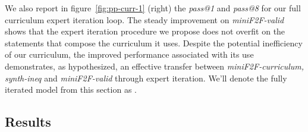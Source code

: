 \documentclass[nohyperref]{article}
\theoremstyle{plain}
\theoremstyle{definition}
\theoremstyle{remark}
\begin{document}
We also report in figure~\ref{fig:pp-curr-1} (right) the \textit{pass@1} and \textit{pass@8} for our full curriculum expert iteration loop. The steady improvement on \textit{miniF2F-valid} shows that the expert iteration procedure we propose does not overfit on the statements that compose the curriculum it uses. Despite the potential inefficiency of our curriculum, the improved performance associated with its use demonstrates, as hypothesized, an effective transfer between \textit{miniF2F-curriculum, synth-ineq} and \textit{miniF2F-valid} through expert iteration. We'll denote the fully iterated model from this section as .

\subsection{Results}
\end{document}
